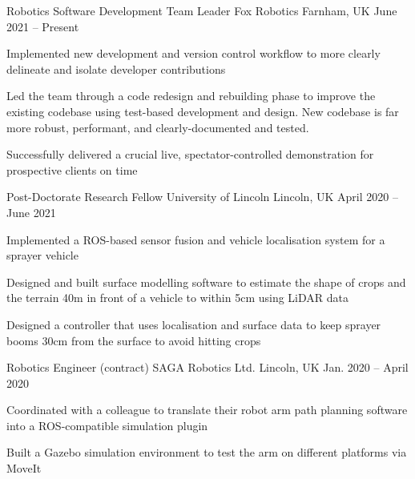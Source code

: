 \documentclass[11pt,a4paper]{awesome-cv}        %
\begin{document}
\makecvheader



\begin{cventries}
  \cventry
  {Robotics Software Development Team Leader}
  {Fox Robotics}
  {Farnham, UK}
  {June 2021 -- Present}
  {
    \begin{cvitems}
      \item Implemented new development and version control workflow to more clearly delineate and isolate developer contributions
      \item Led the team through a code redesign and rebuilding phase to improve the existing codebase using test-based development and design. New codebase is far more robust, performant, and clearly-documented and tested.
      \item Successfully delivered a crucial live, spectator-controlled demonstration for prospective clients on time
    \end{cvitems}
  }
  \cventry
  {Post-Doctorate Research Fellow}
  {University of Lincoln}
  {Lincoln, UK}
  {April 2020 -- June 2021}
  {
    \begin{cvitems}
      \item Implemented a ROS-based sensor fusion and vehicle localisation system for a sprayer vehicle
      \item Designed and built surface modelling software to estimate the shape of crops and the terrain 40m in front of a vehicle to within 5cm using LiDAR data 
      \item Designed a controller that uses localisation and surface data to keep sprayer booms 30cm from the surface to avoid hitting crops
    \end{cvitems}
  }
  \cventry
  {Robotics Engineer (contract)}
  {SAGA Robotics Ltd.}
  {Lincoln, UK}
  {Jan. 2020 -- April 2020}
  {
    \begin{cvitems}
      \item Coordinated with a colleague to translate their robot arm path planning software into a ROS-compatible simulation plugin 
      \item Built a Gazebo simulation environment to test the arm on different platforms via MoveIt

\end{cvitems}}
\end{cventries}
\end{document}
